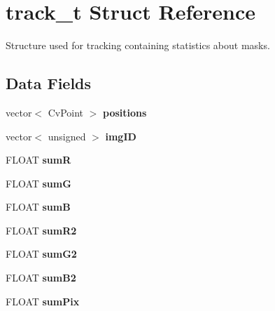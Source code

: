 \hypertarget{structtrack__t}{
\section{track\_\-t Struct Reference}
\label{structtrack__t}
}


Structure used for tracking containing statistics about masks.  


\subsection*{Data Fields}
\begin{DoxyCompactItemize}
\item 
\hypertarget{structtrack__t_ac89e0e880380df01df650508b7b0990c}{
vector$<$ CvPoint $>$ {\bfseries positions}}
\label{structtrack__t_ac89e0e880380df01df650508b7b0990c}

\item 
\hypertarget{structtrack__t_af7844f642dbdbe9d8c2375a0a15677f3}{
vector$<$ unsigned $>$ {\bfseries imgID}}
\label{structtrack__t_af7844f642dbdbe9d8c2375a0a15677f3}

\item 
\hypertarget{structtrack__t_ac17741960723a42ded7b9d97abe0dd3a}{
FLOAT {\bfseries sumR}}
\label{structtrack__t_ac17741960723a42ded7b9d97abe0dd3a}

\item 
\hypertarget{structtrack__t_aff87536f7a7705d998cae4223b459eff}{
FLOAT {\bfseries sumG}}
\label{structtrack__t_aff87536f7a7705d998cae4223b459eff}

\item 
\hypertarget{structtrack__t_a6d505bddcc8606cc148c1fd69953702c}{
FLOAT {\bfseries sumB}}
\label{structtrack__t_a6d505bddcc8606cc148c1fd69953702c}

\item 
\hypertarget{structtrack__t_a36054b8ed79f37056944663eeab2b486}{
FLOAT {\bfseries sumR2}}
\label{structtrack__t_a36054b8ed79f37056944663eeab2b486}

\item 
\hypertarget{structtrack__t_a72a1fc813632200bc7ecdceb5b658ce4}{
FLOAT {\bfseries sumG2}}
\label{structtrack__t_a72a1fc813632200bc7ecdceb5b658ce4}

\item 
\hypertarget{structtrack__t_aac0c09c1ea505c498e94480c1a3f68b1}{
FLOAT {\bfseries sumB2}}
\label{structtrack__t_aac0c09c1ea505c498e94480c1a3f68b1}

\item 
\hypertarget{structtrack__t_a3d99f9059b212d250dc897ae949fdc35}{
FLOAT {\bfseries sumPix}}
\label{structtrack__t_a3d99f9059b212d250dc897ae949fdc35}

\end{DoxyCompactItemize}

